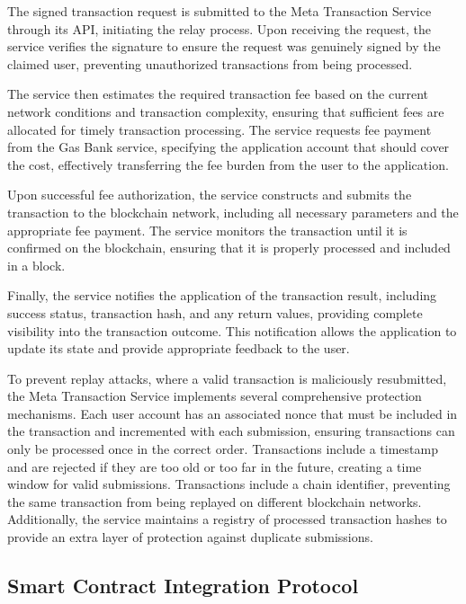 \documentclass[12pt,a4paper]{article}
\begin{document}
The signed transaction request is submitted to the Meta Transaction Service through its API, initiating the relay process. Upon receiving the request, the service verifies the signature to ensure the request was genuinely signed by the claimed user, preventing unauthorized transactions from being processed.

The service then estimates the required transaction fee based on the current network conditions and transaction complexity, ensuring that sufficient fees are allocated for timely transaction processing. The service requests fee payment from the Gas Bank service, specifying the application account that should cover the cost, effectively transferring the fee burden from the user to the application.

Upon successful fee authorization, the service constructs and submits the transaction to the blockchain network, including all necessary parameters and the appropriate fee payment. The service monitors the transaction until it is confirmed on the blockchain, ensuring that it is properly processed and included in a block.

Finally, the service notifies the application of the transaction result, including success status, transaction hash, and any return values, providing complete visibility into the transaction outcome. This notification allows the application to update its state and provide appropriate feedback to the user.

To prevent replay attacks, where a valid transaction is maliciously resubmitted, the Meta Transaction Service implements several comprehensive protection mechanisms. Each user account has an associated nonce that must be included in the transaction and incremented with each submission, ensuring transactions can only be processed once in the correct order. Transactions include a timestamp and are rejected if they are too old or too far in the future, creating a time window for valid submissions. Transactions include a chain identifier, preventing the same transaction from being replayed on different blockchain networks. Additionally, the service maintains a registry of processed transaction hashes to provide an extra layer of protection against duplicate submissions.

\subsection{Smart Contract Integration Protocol}
\label{subsec:smart-contract-protocol-spec}
\end{document}

